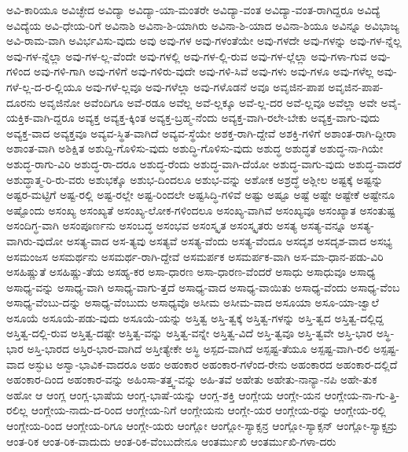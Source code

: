 {ಅವಿ-ಕಾರಿಯೂ
ಅವಿಚ್ಛೇದ
ಅವಿದ್ಯಾ
ಅವಿದ್ಯಾ-ಯಾ-ಮಂತರೇ
ಅವಿದ್ಯಾ-ವಂತ
ಅವಿದ್ಯಾ-ವಂತ-ರಾಗಿದ್ದರೂ
ಅವಿದ್ಯೆ
ಅವಿದ್ಯೆಯ
ಅವಿ-ಧೇಯ-ರಿಗೆ
ಅವಿನಾಶಿ
ಅವಿನಾ-ಶಿ-ಯಾಗಿರು
ಅವಿನಾ-ಶಿ-ಯಾದ
ಅವಿನಾ-ಶಿಯೂ
ಅವಿನ್ನೂ
ಅವಿಭಾಜ್ಯ
ಅವಿ-ರಾಮ-ವಾಗಿ
ಅವಿರ್ಭವಿಸು-ವುದು
ಅವು
ಅವು-ಗಳ
ಅವು-ಗಳಂತೆಯೇ
ಅವು-ಗಳದೇ
ಅವು-ಗಳನ್ನು
ಅವು-ಗಳ-ನ್ನೆಲ್ಲ
ಅವು-ಗಳ-ನ್ನೆಲ್ಲಾ
ಅವು-ಗಳ-ಲ್ಲ-ವೆಂದೇ
ಅವು-ಗಳಲ್ಲಿ
ಅವು-ಗಳ-ಲ್ಲಿ-ರುವ
ಅವು-ಗಳ-ಲ್ಲೆಲ್ಲಾ
ಅವು-ಗಳಾ-ಗುವ
ಅವು-ಗಳಿಂದ
ಅವು-ಗಳಿ-ಗಾಗಿ
ಅವು-ಗಳಿಗೆ
ಅವು-ಗಳಿರು-ವುದೇ
ಅವು-ಗಳಿ-ಸಿವೆ
ಅವು-ಗಳು
ಅವು-ಗಳೂ
ಅವು-ಗಳೆಲ್ಲ
ಅವು-ಗಳೆ-ಲ್ಲ-ದ-ರ-ಲ್ಲಿಯೂ
ಅವು-ಗಳೆ-ಲ್ಲವೂ
ಅವು-ಗಳೆಲ್ಲಾ
ಅವು-ಗಳೊಡನೆ
ಅವೂ
ಅವೃಜಿನ-ಪಾಪ
ಅವೃಜಿನ-ಪಾಪ-ದೂರನು
ಅವೃಜಿನೋ
ಅವೆಂದಿಗೂ
ಅವೆ-ರಡೂ
ಅವೆಲ್ಲ
ಅವೆ-ಲ್ಲಕ್ಕೂ
ಅವೆ-ಲ್ಲ-ದರ
ಅವೆ-ಲ್ಲವೂ
ಅವೆಲ್ಲಾ
ಅವೇ
ಅವೈ-ಯಕ್ತಿಕ-ವಾಗಿ-ದ್ದರೂ
ಅವ್ಯಕ್ತ
ಅವ್ಯಕ್ತ-ಕ್ಕಿಂತ
ಅವ್ಯಕ್ತ-ಬ್ರಹ್ಮ-ನೆಂದು
ಅವ್ಯಕ್ತ-ವಾಗಿ-ರಲೇ-ಬೇಕು
ಅವ್ಯಕ್ತ-ವಾಗು-ವುದು
ಅವ್ಯಕ್ತ-ವಾದ
ಅವ್ಯಕ್ತವೂ
ಅವ್ಯವ-ಸ್ಥಿತ-ವಾಗಿದೆ
ಅವ್ಯವ-ಸ್ಥೆಯೇ
ಅಶಕ್ತ-ರಾಗಿ-ದ್ದೇವೆ
ಅಶಕ್ತಿ-ಗಳಿಗೆ
ಅಶಾಂತ-ರಾಗಿ-ದ್ದೀರಾ
ಅಶಾಂತ-ವಾಗಿ
ಅಶಿಕ್ಷಿತ
ಅಶುದ್ದಿ-ಗೊಳಿಸು-ವುದು
ಅಶುದ್ಧಿ-ಗೊಳಿಸು-ವುದು
ಅಶುದ್ಧ
ಅಶುದ್ಧತೆ
ಅಶುದ್ಧ-ನಾ-ಗಿಯೇ
ಅಶುದ್ಧ-ರಾಗು-ವಿರಿ
ಅಶುದ್ಧ-ರಾ-ದರೂ
ಅಶುದ್ಧ-ರೆಂದು
ಅಶುದ್ಧ-ವಾಗಿ-ದೆಯೋ
ಅಶುದ್ಧ-ವಾಗು-ವುದು
ಅಶುದ್ಧ-ವಾದರೆ
ಅಶುದ್ಧಾತ್ಮ-ರಿ-ರು-ವರು
ಅಶುಭಕ್ಕೊ
ಅಶುಭ-ದಿಂದಲೂ
ಅಶುಭ-ವನ್ನು
ಅಶೋಕ
ಅಶ್ರದ್ಧೆ
ಅಶ್ಲೀಲ
ಅಷ್ಟಕ್ಕೆ
ಅಷ್ಟನ್ನು
ಅಷ್ಟರ-ಮಟ್ಟಿಗೆ
ಅಷ್ಟ-ರಲ್ಲಿ
ಅಷ್ಟ-ರಲ್ಲೇ
ಅಷ್ಟ-ರಿಂದಲೇ
ಅಷ್ಟಸಿದ್ಧಿ-ಗಳಿವೆ
ಅಷ್ಟು
ಅಷ್ಟೂ
ಅಷ್ಟೆ
ಅಷ್ಟೇ
ಅಷ್ಟೇಕೆ
ಅಷ್ಟೇನೂ
ಅಷ್ಟೊಂದು
ಅಸಂಖ್ಯ
ಅಸಂಖ್ಯತೆ
ಅಸಂಖ್ಯ-ಲೋಕ-ಗಳಿಂದಲೂ
ಅಸಂಖ್ಯ-ವಾಗಿವೆ
ಅಸಂಖ್ಯವೂ
ಅಸಂಖ್ಯಾತ
ಅಸಂತುಷ್ಟ
ಅಸಂದಿಗ್ಧ-ವಾಗಿ
ಅಸಂಪೂರ್ಣನು
ಅಸಂಬದ್ಧ
ಅಸಂಭವ
ಅಸಂಸ್ಕೃತ
ಅಸಂಸ್ಕೃತರು
ಅಸತ್ಯ
ಅಸತ್ಯ-ವನ್ನೂ
ಅಸತ್ಯ-ವಾಗಿರು-ವುದೋ
ಅಸತ್ಯ-ವಾದ
ಅಸ-ತ್ಯವು
ಅಸತ್ಯವೆ
ಅಸತ್ಯ-ವೆಂದು
ಅಸತ್ಯ-ವೆಂದೂ
ಅಸದೃಶ
ಅಸದೃಶ-ವಾದ
ಅಸಭ್ಯ
ಅಸಮಂಜಸ
ಅಸಮರ್ಥನು
ಅಸಮರ್ಥ-ರಾಗಿ-ದ್ದೇವೆ
ಅಸಮರ್ಪಕ
ಅಸಮರ್ಪಕ-ವಾಗಿ
ಅಸ-ಮಾ-ಧಾನ-ಪಡು-ವಿರಿ
ಅಸಹಿಷ್ಣುತೆ
ಅಸಹಿಷ್ಣು-ತೆಯ
ಅಸಹ್ಯ-ಕರ
ಅಸಾ-ಧಾರಣ
ಅಸಾ-ಧಾರಣ-ವೆಂದರೆ
ಅಸಾಧು
ಅಸಾಧುವೂ
ಅಸಾಧ್ಯ
ಅಸಾಧ್ಯ-ವನ್ನು
ಅಸಾಧ್ಯ-ವಾಗಿ
ಅಸಾಧ್ಯ-ವಾಗು-ತ್ತದೆ
ಅಸಾಧ್ಯ-ವಾದ
ಅಸಾಧ್ಯ-ವಾಯಿತು
ಅಸಾಧ್ಯ-ವೆಂದು
ಅಸಾಧ್ಯ-ವೆಂಬ
ಅಸಾಧ್ಯ-ವೆಂಬು-ದನ್ನು
ಅಸಾಧ್ಯ-ವೆಂಬುದು
ಅಸಾಧ್ಯವೊ
ಅಸೀಮ
ಅಸೀಮ-ವಾದ
ಅಸೂಯಾ
ಅಸೂ-ಯಾ-ಜ್ವಾಲೆ
ಅಸೂಯೆ
ಅಸೂಯೆ-ಪಡು-ವುದು
ಅಸೂಯೆ-ಯನ್ನು
ಅಸ್ತಿತ್ವ
ಅಸ್ತಿ-ತ್ವಕ್ಕೆ
ಅಸ್ತಿತ್ವ-ಗಳನ್ನು
ಅಸ್ತಿ-ತ್ವದ
ಅಸ್ತಿತ್ವ-ದಲ್ಲಿದ್ದ
ಅಸ್ತಿತ್ವ-ದಲ್ಲಿ-ರುವ
ಅಸ್ತಿತ್ವ-ದಷ್ಟೇ
ಅಸ್ತಿತ್ವ-ವನ್ನು
ಅಸ್ತಿತ್ವ-ವನ್ನೇ
ಅಸ್ತಿತ್ವ-ವಿದೆ
ಅಸ್ತಿ-ತ್ವವೂ
ಅಸ್ತಿ-ತ್ವವೇ
ಅಸ್ತಿ-ಭಾರ
ಅಸ್ಥಿ-ಭಾರ
ಅಸ್ತಿ-ಭಾರದ
ಅಸ್ತಿರ-ಭಾರ-ವಾಗಿದೆ
ಅಸ್ತೀತ್ಯೇಕೇ
ಅಸ್ಥಿ
ಅಸ್ಪದ-ವಾಗಿದೆ
ಅಸ್ಪಷ್ಟ-ತೆಯೂ
ಅಸ್ಪಷ್ಟ-ವಾಗಿ-ರಲಿ
ಅಸ್ಪಷ್ಟ-ವಾದ
ಅಸ್ಫುಟ
ಅಸ್ವಾ-ಭಾವಿಕ-ವಾದರೂ
ಅಹಂ
ಅಹಂಕಾರ
ಅಹಂಕಾರ-ಗಳೆಂದ-ರೇನು
ಅಹಂಕಾರದ
ಅಹಂಕಾರ-ದಲ್ಲಿದೆ
ಅಹಂಕಾರ-ದಿಂದ
ಅಹಂಕಾರ-ವನ್ನು
ಅಹಿಂಸಾ-ತತ್ತ್ವ-ವನ್ನು
ಅಹಿ-ತವೆ
ಅಹೇತು
ಅಹೇತು-ನಾನ್ಯಾ-ನಪಿ
ಅಹೇ-ತುಕ
ಅಹೋ
ಆ
ಆಂಗ್ಲ
ಆಂಗ್ಲ-ಭಾಷೆಯ
ಆಂಗ್ಲ-ಭಾಷೆ-ಯನ್ನು
ಆಂಗ್ಲ-ಶಕ್ತಿ
ಆಂಗ್ಲೇಯ
ಆಂಗ್ಲೇ-ಯನ
ಆಂಗ್ಲೇಯ-ನಾ-ಗು-ತ್ತಿ-ರಲಿಲ್ಲ
ಆಂಗ್ಲೇಯ-ನಾದು-ದ-ರಿಂದ
ಆಂಗ್ಲೇಯ-ನಿಗೆ
ಆಂಗ್ಲೇಯನು
ಆಂಗ್ಲೇ-ಯರ
ಆಂಗ್ಲೇಯ-ರನ್ನು
ಆಂಗ್ಲೇಯ-ರಲ್ಲಿ
ಆಂಗ್ಲೇಯ-ರಿಂದ
ಆಂಗ್ಲೇಯ-ರಿಗೂ
ಆಂಗ್ಲೇ-ಯರು
ಆಂಗ್ಲೋ
ಆಂಗ್ಲೋ-ಸ್ಯಾಕ್ಸನ್ರ
ಆಂಗ್ಲೋ-ಸ್ಯಾಕ್ಸನ್
ಆಂಗ್ಲೋ-ಸ್ಯಾಕ್ಸನ್ರು
ಆಂತ-ರಿಕ
ಆಂತ-ರಿಕ-ವಾದುದು
ಆಂತ-ರಿಕ-ವೆಂಬುದೇನೂ
ಆಂತರ್ಮುಖಿ
ಆಂತರ್ಮುಖಿ-ಗಳಾ-ದರು
}

